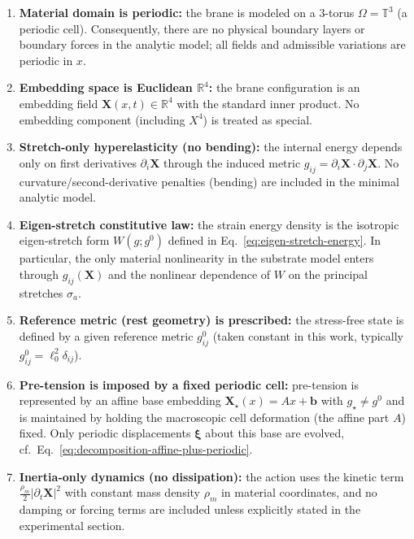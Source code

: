 \begin{enumerate}
  \item \textbf{Material domain is periodic:}
  the brane is modeled on a 3-torus $\Omega=\mathbb T^3$ (a periodic cell).
  Consequently, there are no physical boundary layers or boundary forces in the analytic model;
  all fields and admissible variations are periodic in $x$.

  \item \textbf{Embedding space is Euclidean $\mathbb R^4$:}
  the brane configuration is an embedding field $\mathbf X(x,t)\in\mathbb R^4$
  with the standard inner product. No embedding component (including $X^4$) is treated as special.

  \item \textbf{Stretch-only hyperelasticity (no bending):}
  the internal energy depends only on first derivatives $\partial_i\mathbf X$
  through the induced metric $g_{ij}=\partial_i\mathbf X\cdot\partial_j\mathbf X$.
  No curvature/second-derivative penalties (bending) are included in the minimal analytic model.

  \item \textbf{Eigen-stretch constitutive law:}
  the strain energy density is the isotropic eigen-stretch form
  $W(g;g^0)$ defined in Eq.~\eqref{eq:eigen-stretch-energy}.
  In particular, the only material nonlinearity in the substrate model enters through
  $g_{ij}(\mathbf X)$ and the nonlinear dependence of $W$ on the principal stretches $\sigma_a$.

  \item \textbf{Reference metric (rest geometry) is prescribed:}
  the stress-free state is defined by a given reference metric $g^0_{ij}$
  (taken constant in this work, typically $g^0_{ij}=\ell_0^2\delta_{ij}$).

  \item \textbf{Pre-tension is imposed by a fixed periodic cell:}
  pre-tension is represented by an affine base embedding $\mathbf X_\star(x)=Ax+\mathbf b$
  with $g_\star\neq g^0$ and is maintained by holding the macroscopic cell deformation (the affine part $A$) fixed.
  Only periodic displacements $\boldsymbol\xi$ about this base are evolved,
  cf.\ Eq.~\eqref{eq:decomposition-affine-plus-periodic}.

  \item \textbf{Inertia-only dynamics (no dissipation):}
  the action uses the kinetic term $\frac{\rho_m}{2}|\partial_t\mathbf X|^2$
  with constant mass density $\rho_m$ in material coordinates, and no damping or forcing terms
  are included unless explicitly stated in the experimental section.


\end{enumerate}
